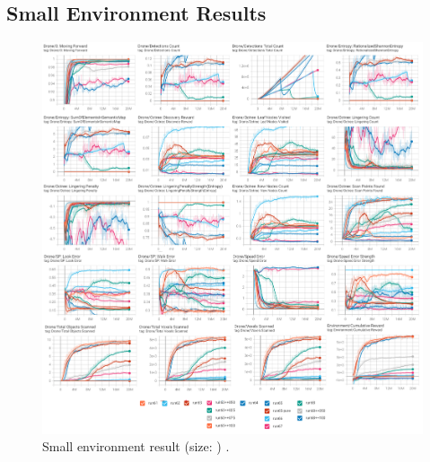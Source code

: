\subsection{Small Environment Results}
\begin{figure}[!ht]
        \centering
        \includegraphics[width=1\textwidth]{images/results_baseAgent.png}
        \caption{Small environment result (size: ) .
        }
        \label{fig:results-small-env-performances}
\end{figure}
